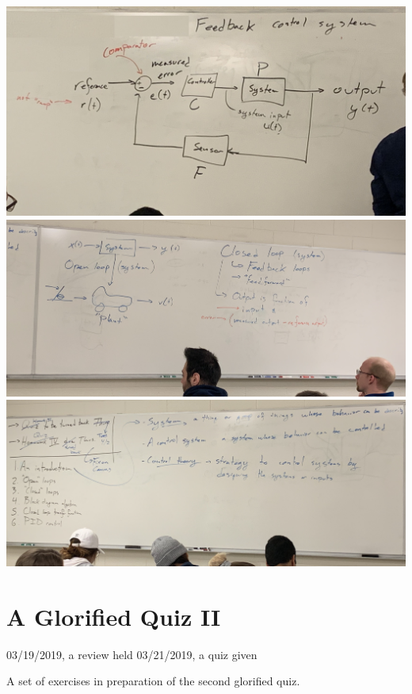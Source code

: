 \documentclass[11pt]{book}
\begin{document}
\\
\includegraphics[width=\textwidth]{figures/3_26_7.jpg}
\\
\includegraphics[width=\textwidth]{figures/3_26_8.jpg}
\\
\includegraphics[width=\textwidth]{figures/3_26_9.jpg}
\\

\chapter*{A Glorified Quiz II}
03/19/2019, a review held
03/21/2019, a quiz given

A set of exercises in preparation of the second glorified quiz.
\end{document}

